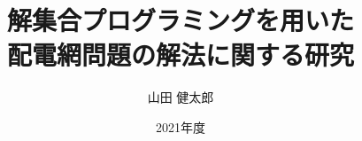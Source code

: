 \documentclass[japanese,dvipdfmx]{jbook}
\institute{名古屋大学大学院情報学研究科}
\title{解集合プログラミングを用いた\\配電網問題の解法に関する研究}
\date{2021年度}
\author{山田 健太郎}
\begin{document}
\maketitle



\tableofcontents    %
\listoffigures      %
\listoftables       %
\lstlistoflistings  %














\end{document}
